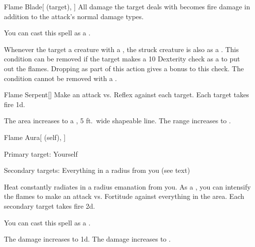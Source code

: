 \lowercase{\hypertarget{spell:Flame Blade}{}}\label{spell:Flame Blade}
\begin{attuneability}[Rank 3]{\hypertarget{spell:Flame Blade}{Flame Blade}}[ (target), ]
All damage the target deals with  becomes fire damage in addition to the attack's normal damage types.

You can cast this spell as a .

\rankline
{} Whenever the target  a creature with a , the struck creature is also  as a .
This condition can be removed if the target makes a  10 Dexterity check as a  to put out the flames.
Dropping  as part of this action gives a  bonus to this check.
 The condition cannot be removed with a .
\end{attuneability}
\vspace{0.25em}



\lowercase{\hypertarget{spell:Flame Serpent}{}}\label{spell:Flame Serpent}
\begin{freeability}[Rank 3]{\hypertarget{spell:Flame Serpent}{Flame Serpent}}[]
Make an attack vs. Reflex against each target.
\hit Each target takes fire  \minus1d.

\rankline
{} The area increases to a \arealarge, 5 ft.\ wide shapeable line.
 The range increases to \rngmed.
\end{freeability}
\vspace{0.25em}



\lowercase{\hypertarget{spell:Flame Aura}{}}\label{spell:Flame Aura}
\begin{attuneability}[Rank 4]{\hypertarget{spell:Flame Aura}{Flame Aura}}[ (self), ]

Primary target: Yourself
\par\noindent
Secondary targets: Everything in a \areasmall radius from you (see text)

Heat constantly radiates in a \areasmall radius emanation from you.
As a , you can intensify the flames to make an attack vs. Fortitude against everything in the area.
\hit Each secondary target takes fire  \minus2d.

You can cast this spell as a .

\rankline
{} The damage increases to  \minus1d.
 The damage increases to .
\end{attuneability}
\vspace{0.25em}



